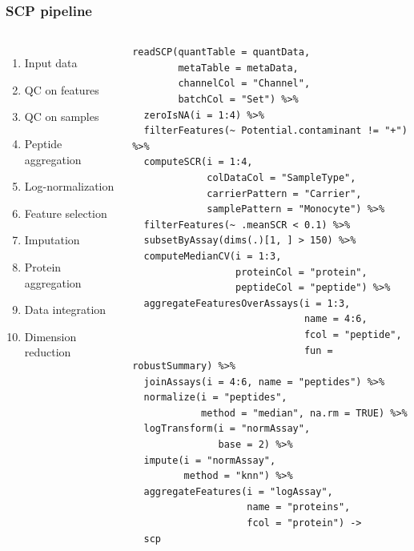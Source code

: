 \documentclass{beamer}
\begin{document}
\begin{frame}[fragile]
  \frametitle{SCP pipeline}
 
  \begin{columns}
    \footnotesize
    \begin{enumerate}
      \item Input data
      \item QC on features
      \item QC on samples
      \item Peptide aggregation
      \item Log-normalization
      \item Feature selection
      \item Imputation
      \item Protein aggregation 
      \item Data integration
      \item Dimension reduction
    \end{enumerate}
    
    
    \begin{lstlisting}
readSCP(quantTable = quantData, 
        metaTable = metaData,
        channelCol = "Channel", 
        batchCol = "Set") %>%
  zeroIsNA(i = 1:4) %>%
  filterFeatures(~ Potential.contaminant != "+") %>%
  computeSCR(i = 1:4, 
             colDataCol = "SampleType",
             carrierPattern = "Carrier",
             samplePattern = "Monocyte") %>%
  filterFeatures(~ .meanSCR < 0.1) %>%
  subsetByAssay(dims(.)[1, ] > 150) %>%
  computeMedianCV(i = 1:3, 
                  proteinCol = "protein",
                  peptideCol = "peptide") %>%
  aggregateFeaturesOverAssays(i = 1:3, 
                              name = 4:6,
                              fcol = "peptide",
                              fun = robustSummary) %>%
  joinAssays(i = 4:6, name = "peptides") %>%
  normalize(i = "peptides", 
            method = "median", na.rm = TRUE) %>%
  logTransform(i = "normAssay",
               base = 2) %>%
  impute(i = "normAssay",
         method = "knn") %>%
  aggregateFeatures(i = "logAssay", 
                    name = "proteins",
                    fcol = "protein") ->
  scp
    \end{lstlisting}
  \end{columns}
\end{frame}
\end{document}
